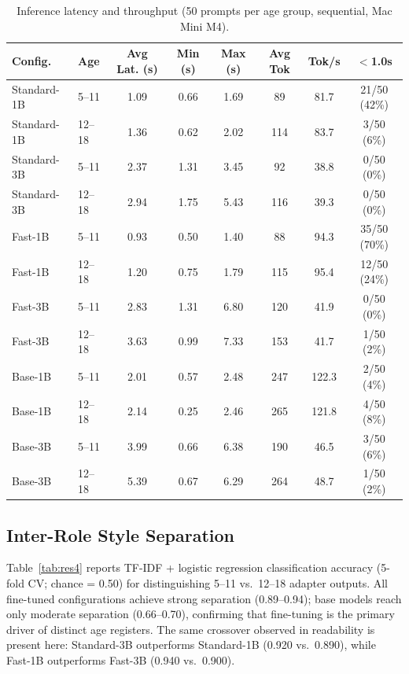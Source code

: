 \documentclass[journal]{IEEEtai}
\begin{document}
\begin{table}[!t]
  \caption{Inference latency and throughput (50 prompts per age group, sequential, Mac Mini M4).}
  \label{tab:res3}
  \small
  \begin{tabular}{llcccccc}
    \hline
    Config. & Age & Avg Lat. (s) & Min (s) & Max (s) & Avg Tok & Tok/s & $<$1.0s \\
    \hline
    Standard-1B & 5--11  & 1.09 & 0.66 & 1.69 & 89  & 81.7  & 21/50 (42\%) \\
    Standard-1B & 12--18 & 1.36 & 0.62 & 2.02 & 114 & 83.7  & 3/50 (6\%)   \\
    Standard-3B & 5--11  & 2.37 & 1.31 & 3.45 & 92  & 38.8  & 0/50 (0\%)   \\
    Standard-3B & 12--18 & 2.94 & 1.75 & 5.43 & 116 & 39.3  & 0/50 (0\%)   \\
    Fast-1B     & 5--11  & 0.93 & 0.50 & 1.40 & 88  & 94.3  & 35/50 (70\%) \\
    Fast-1B     & 12--18 & 1.20 & 0.75 & 1.79 & 115 & 95.4  & 12/50 (24\%) \\
    Fast-3B     & 5--11  & 2.83 & 1.31 & 6.80 & 120 & 41.9  & 0/50 (0\%)   \\
    Fast-3B     & 12--18 & 3.63 & 0.99 & 7.33 & 153 & 41.7  & 1/50 (2\%)   \\
    Base-1B     & 5--11  & 2.01 & 0.57 & 2.48 & 247 & 122.3 & 2/50 (4\%)   \\
    Base-1B     & 12--18 & 2.14 & 0.25 & 2.46 & 265 & 121.8 & 4/50 (8\%)   \\
    Base-3B     & 5--11  & 3.99 & 0.66 & 6.38 & 190 & 46.5  & 3/50 (6\%)   \\
    Base-3B     & 12--18 & 5.39 & 0.67 & 6.29 & 264 & 48.7  & 1/50 (2\%)   \\
    \hline
  \end{tabular}
\end{table}

\subsection{Inter-Role Style Separation}

Table~\ref{tab:res4} reports TF-IDF + logistic regression classification accuracy (5-fold CV; chance = 0.50) for distinguishing 5--11 vs.\ 12--18 adapter outputs. All fine-tuned configurations achieve strong separation (0.89--0.94); base models reach only moderate separation (0.66--0.70), confirming that fine-tuning is the primary driver of distinct age registers. The same crossover observed in readability is present here: Standard-3B outperforms Standard-1B (0.920 vs.\ 0.890), while Fast-1B outperforms Fast-3B (0.940 vs.\ 0.900).
\end{document}
